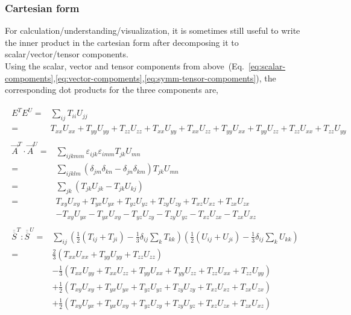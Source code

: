 \documentclass[10pt,fleqn]{article}
\newcommand{\eqar}[1]
{
  \begin{align}
    #1
  \end{align}
}
\newcommand{\paren}[1]{{\left({#1}\right)}}
\begin{document}
\subsubsection{Cartesian form}
For calculation/understanding/visualization, it is sometimes still useful to write
the inner product in the cartesian form after decomposing it to
scalar/vector/tensor components.\\

Using the scalar, vector and tensor components from above~(Eq.~\ref{eq:scalar-compoments},\ref{eq:vector-compoments},\ref{eq:symm-tensor-compoments}),
the corresponding dot products for the three components are,
\eqar{
  \begin{split}
    E^{T}E^{U}=&\sum_{ij}T_{ii}U_{jj}\\
    =&T_{xx}U_{xx}+T_{yy}U_{yy}+T_{zz}U_{zz}
       +T_{xx}U_{yy}+T_{xx}U_{zz}+T_{yy}U_{xx}+T_{yy}U_{zz}+T_{zz}U_{xx}+T_{zz}U_{yy}
  \end{split}\\
  \begin{split}
    \vec A^{T}\cdot\vec A^{U}=&\sum_{ijkmm}\varepsilon_{ijk}\varepsilon_{imm}T_{jk}U_{mn}\\
    =&\sum_{ijklm}\paren{\delta_{jm}\delta_{kn}-\delta_{jn}\delta_{km}}T_{jk}U_{mn}\\
    =&\sum_{jk}\paren{T_{jk}U_{jk}-T_{jk}U_{kj}}\\
    =&T_{xy}U_{xy}+T_{yx}U_{yx}+T_{yz}U_{yz}+T_{zy}U_{zy}+T_{xz}U_{xz}+T_{zx}U_{zx}\\&
    -T_{xy}U_{yx}-T_{yx}U_{xy}-T_{yz}U_{zy}-T_{zy}U_{yz}-T_{xz}U_{zx}-T_{zx}U_{xz}
  \end{split}\\
  \begin{split}
    \overline{\overline{S}}^{T}:\overline{\overline{S}}^{U}=&\sum_{ij}\paren{\frac12\paren{T_{ij}+T_{ji}}-\frac13\delta_{ij}\sum_{k}T_{kk}}
       \paren{\frac12\paren{U_{ij}+U_{ji}}-\frac13\delta_{ij}\sum_{k}U_{kk}}\\
    =&\frac23\paren{T_{xx}U_{xx}+T_{yy}U_{yy}+T_{zz}U_{zz}}\\&
    -\frac13\paren{T_{xx}U_{yy}+T_{xx}U_{zz}+T_{yy}U_{xx}+T_{yy}U_{zz}+T_{zz}U_{xx}+T_{zz}U_{yy}}\\&
    +\frac12\paren{T_{xy}U_{xy}+T_{yx}U_{yx}+T_{yz}U_{yz}+T_{zy}U_{zy}+T_{xz}U_{xz}+T_{zx}U_{zx}}\\&
    +\frac12\paren{T_{xy}U_{yx}+T_{yx}U_{xy}+T_{yz}U_{zy}+T_{zy}U_{yz}+T_{xz}U_{zx}+T_{zx}U_{xz}}
  \end{split}
}
\end{document}
